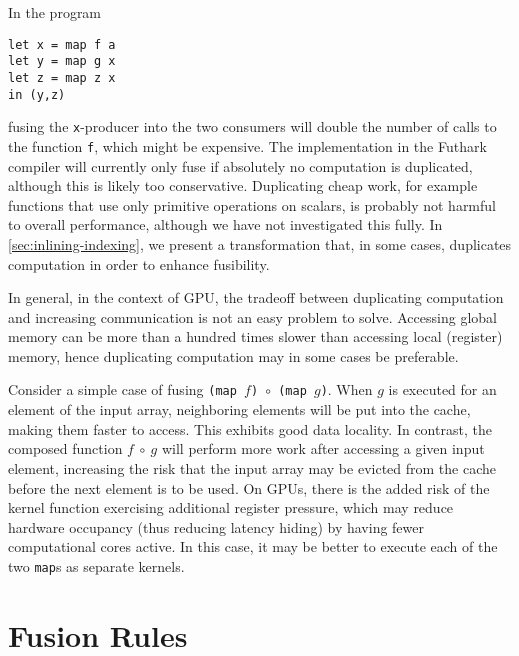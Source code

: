 \begin{description}[style=nextline]
\item[Computation may be duplicated.]

In the program
\begin{lstlisting}
let x = map f a
let y = map g x
let z = map z x
in (y,z)
\end{lstlisting}
fusing the \texttt{x}-producer into the two consumers will double the
number of calls to the function \texttt{f}, which might be expensive.
The implementation in the Futhark compiler will currently only fuse if
absolutely no computation is duplicated, although this is likely too
conservative.  Duplicating cheap work, for example functions that use
only primitive operations on scalars, is probably not harmful to
overall performance, although we have not investigated this fully.  In
\cref{sec:inlining-indexing}, we present a transformation that, in
some cases, duplicates computation in order to enhance fusibility.

In general, in the context of GPU, the tradeoff between duplicating
computation and increasing communication is not an easy problem to
solve.  Accessing global memory can be more than a hundred times
slower than accessing local (register) memory, hence duplicating
computation may in some cases be preferable.

\item[Can reduce memory locality.]

  Consider a simple case of fusing
  \texttt{(map~$f$)~$\circ$~(map~$g$)}.  When $g$ is executed for an
  element of the input array, neighboring elements will be put into
  the cache, making them faster to access.  This exhibits good data
  locality.  In contrast, the composed function $f~\circ~g$ will
  perform more work after accessing a given input element, increasing
  the risk that the input array may be evicted from the cache before
  the next element is to be used.  On GPUs, there is the added risk of
  the kernel function exercising additional register pressure, which
  may reduce hardware occupancy (thus reducing latency hiding) by
  having fewer computational cores active.  In this case, it may be
  better to execute each of the two \texttt{map}s as separate kernels.
\end{description}

\newpage
\section{Fusion Rules}

